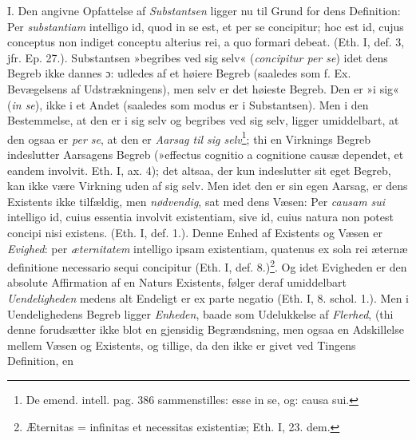 \documentclass[12pt,a4paper]{book}
\newcommand{\opage}[1]{\marginnote{\footnotesize\textit{[#1]}}}
\begin{document}
I. Den angivne Opfattelse af \emph{Substantsen} ligger nu til Grund for
dens Definition: Per \emph{substantiam} intelligo id, quod in se est,
et per se concipitur; hoc est id, cujus conceptus non indiget conceptu
alterius rei, a quo formari debeat. (Eth. I, def. 3, jfr. Ep. 27.).
Substantsen »begribes ved sig selv« (\emph{concipitur per se}) idet
dens Begreb ikke dannes ɔ: udledes af et høiere Begreb (saaledes som f.
Ex. Bevægelsens af Udstrækningens), men selv er det høieste Begreb. Den
er »i sig« (\emph{in se}), ikke i et Andet (saaledes som modus er i
Substantsen).
Men i den Bestemmelse, at den er i sig selv og begribes ved sig selv,
\opage{45} \setcounter{footnote}{0}%
ligger umiddelbart, at den ogsaa er \emph{per se}, at den er
\emph{Aarsag til sig selv}\footnote{De emend. intell. pag. 386
sammenstilles: esse in se, og: causa sui.}; thi en Virknings Begreb
indeslutter Aarsagens Begreb (»effectus cognitio a cognitione causæ
dependet, et eandem involvit. Eth. I, ax. 4); det altsaa, der kun
indeslutter sit eget Begreb, kan ikke være Virkning uden af sig selv.
Men idet den er sin egen Aarsag, er dens Existents ikke tilfældig, men
\emph{nødvendig}, sat med dens Væsen: Per \emph{causam sui} intelligo id,
cuius essentia involvit existentiam, sive id, cuius natura non potest
concipi nisi existens. (Eth. I, def. 1.). Denne Enhed af Existents og
Væsen er \emph{Evighed}: per \emph{æternitatem} intelligo ipsam existentiam,
quatenus ex sola rei æternæ definitione necessario sequi concipitur
(Eth. I, def. 8.)\footnote{Æternitas = infinitas et necessitas
existentiæ; Eth. I, 23. dem.}. Og idet Evigheden er den absolute
Affirmation af en Naturs Existents, følger deraf umiddelbart
\emph{Uendeligheden} medens alt Endeligt er ex parte negatio (Eth. I,
8. schol. 1.). Men i Uendelighedens Begreb ligger \emph{Enheden}, baade
som Udelukkelse af \emph{Flerhed}, (thi denne forudsætter ikke blot en
gjensidig Begrændsning, men ogsaa en Adskillelse mellem Væsen og
Existents, og tillige, da den ikke er givet ved Tingens Definition, en
\end{document}
